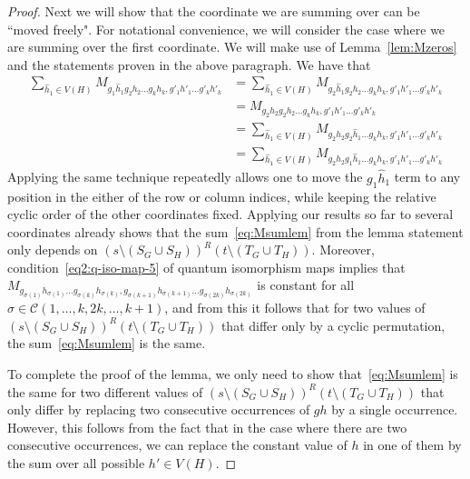 \documentclass[11pt,a4paper]{article}
\theoremstyle{plain}
\theoremstyle{remark}
\theoremstyle{definition}
\newcommand{\cyclicpermutations}{\mathscr{C}(1,\dots, k, 2k, \dots, k+1)}
\begin{document}
\begin{proof}
Next we will show that the coordinate we are summing over can be ``moved freely". For notational convenience, we will consider the case where we are summing over the first coordinate. We will make use of Lemma~\ref{lem:Mzeros} and the statements proven in the above paragraph. We have that
\begin{align*}
    \sum_{\hat{h}_1 \in V(H)} M_{g_1\hat{h}_1g_2h_2\ldots g_kh_k,g'_1h'_1\ldots g'_kh'_k} &= \sum_{\hat{h}_1 \in V(H)} M_{g_2\hat{h}_1g_2h_2\ldots g_kh_k,g'_1h'_1\ldots g'_kh'_k} \\
    &= M_{g_2h_2g_2h_2\ldots g_kh_k,g'_1h'_1\ldots g'_kh'_k} \\
    &= \sum_{\hat{h}_1 \in V(H)} M_{g_2h_2g_2\hat{h}_1\ldots g_kh_k,g'_1h'_1\ldots g'_kh'_k} \\
    &= \sum_{\hat{h}_1 \in V(H)} M_{g_2h_2g_1\hat{h}_1\ldots g_kh_k,g'_1h'_1\ldots g'_kh'_k}
\end{align*}
Applying the same technique repeatedly allows one to move the $g_1\hat{h}_1$ term to any position in the either of the row or column indices, while keeping the relative cyclic order of the other coordinates fixed. Applying our results so far to several coordinates already shows that the sum~\eqref{eq:Msumlem} from the lemma statement only depends on $(s\setminus (S_G \cup S_H))^R(t\setminus (T_G \cup T_H))$. Moreover, condition~\eqref{eq2:q-iso-map-5} of quantum isomorphism maps implies that $M_{g_{\sigma(1)}h_{\sigma(1)}\dots g_{\sigma(k)}h_{\sigma(k)}, g_{\sigma(k+1)}h_{\sigma(k+1)}\dots g_{\sigma(2k)}h_{\sigma(2k)}}$
is constant for all $\sigma \in \cyclicpermutations$, and from this it follows that for two values of $(s\setminus (S_G \cup S_H))^R(t\setminus (T_G \cup T_H))$ that differ only by a cyclic permutation, the sum~\eqref{eq:Msumlem} is the same.

To complete the proof of the lemma, we only need to show that~\eqref{eq:Msumlem} is the same for two different values of $(s\setminus (S_G \cup S_H))^R(t\setminus (T_G \cup T_H))$ that only differ by replacing two consecutive occurrences of $gh$ by a single occurrence. However, this follows from the fact that in the case where there are two consecutive occurrences, we can replace the constant value of $h$ in one of them by the sum over all possible $h' \in V(H)$.
\end{proof}
\end{document}
